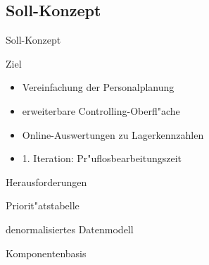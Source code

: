 \subsection{Soll-Konzept}
\begin{frame}[<+->]{Soll-Konzept}
	\begin{block}{Ziel}
		\begin{itemize}
			\item Vereinfachung der Personalplanung
			\item erweiterbare Controlling-Oberfl"ache
			\item Online-Auswertungen zu Lagerkennzahlen
			\item 1. Iteration: Pr"uflosbearbeitungszeit
		\end{itemize}
	\end{block}
	
	\begin{block}{Herausforderungen}
		\begin{description}[Anwenderstatus]
			\item[Anwenderstatus]{Priorit"atstabelle}
			\item[Performance]{denormalisiertes Datenmodell}
			\item[Erweiterbarkeit]{Komponentenbasis}
		\end{description}
	\end{block}
\end{frame}


